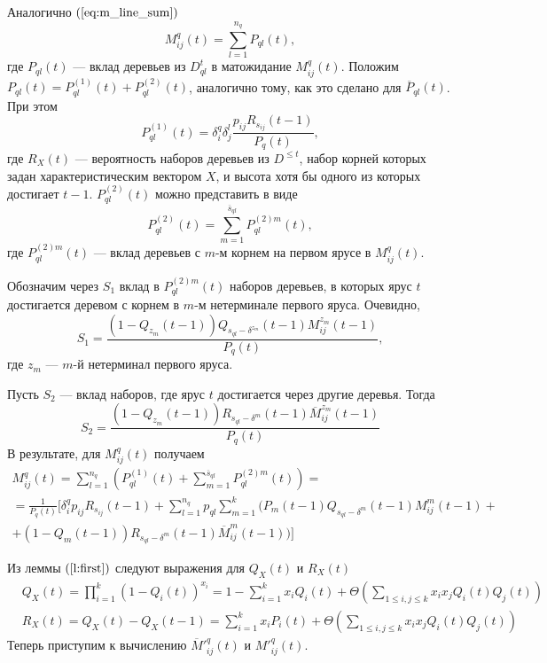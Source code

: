 \documentclass[12pt]{article}
\renewcommand{\leq}{\leqslant}
\begin{document}
Аналогично $(\ref{eq:m_line_sum})$
\begin{equation*}
	M^q_{ij}(t) = \sum_{l = 1}^{n_q} P_{ql}(t),
\end{equation*}
где $P_{ql}(t)$ --- вклад деревьев из $D^t_{ql}$ в матожидание $M^q_{ij}(t)$. Положим $P_{ql}(t) = P^{(1)}_{ql}(t) + P^{(2)}_{ql}(t)$, аналогично тому, как это сделано для $\overline{P}_{ql}(t)$. При этом
\begin{equation*}
	P^{(1)}_{ql}(t) = \delta^q_i \delta^l_j \frac{p_{ij} R_{s_{ij}}(t - 1)}{P_q(t)},
\end{equation*}
где $R_X(t)$ --- вероятность наборов деревьев из $D^{\leq t}$, набор корней которых задан характеристическим вектором $X$, и высота хотя бы одного из которых достигает $t - 1$. $P^{(2)}_{ql}(t)$ можно представить в виде
\begin{equation*}
	P^{(2)}_{ql}(t) = \sum_{m = 1}^{\overline{s}_{ql}} P^{(2)m}_{ql}(t),
\end{equation*}
где $P^{(2)m}_{ql}(t)$ --- вклад деревьев с $m$-м корнем на первом ярусе в $M^q_{ij}(t)$.

Обозначим через $S_1$ вклад в $P^{(2)m}_{ql}(t)$ наборов деревьев, в которых ярус $t$ достигается деревом с корнем в $m$-м нетерминале первого яруса. Очевидно,
\begin{equation*}
	S_1 = \frac{(1 - Q_{z_m}(t-1)) Q_{s_{ql} - \delta^{z_m}}(t - 1) M^{z_m}_{ij}(t - 1)}{P_q(t)},
\end{equation*}
где $z_m$ --- $m$-й нетерминал первого яруса.

Пусть $S_2$ --- вклад наборов, где ярус $t$ достигается через другие деревья. Тогда
\begin{equation*}
	S_2 = \frac{(1 - Q_{z_m}(t - 1)) R_{s_{ql} - \delta^m}(t - 1) \overline{M}^{z_m}_{ij}(t - 1)}{P_q(t)}
\end{equation*}
В результате, для $M^q_{ij}(t)$ получаем
\begin{multline*}
	M^q_{ij}(t) = \sum_{l = 1}^{n_q} \left( P^{(1)}_{ql}(t) + \sum_{m = 1}^{\overline{s}_{ql}} P^{(2)m}_{ql}(t) \right) = \\
	= \frac{1}{P_q(t)} [ \delta^q_i p_{ij} R_{s_{ij}}(t - 1) + \sum_{l = 1}^{n_q} p_{ql} \sum_{m = 1}^k (P_m(t - 1) Q_{s_{ql} - \delta^m}(t - 1) M^m_{ij}(t - 1) + \\
	+ (1 - Q_m(t - 1)) R_{s_{ql} - \delta^m}(t - 1) \overline{M}^m_{ij}(t - 1)) ]
\end{multline*}

Из леммы $(\ref{l:first})$ следуют выражения для $Q_X(t)$ и $R_X(t)$
\begin{equation}
\label{eq:qx_rx}
	\begin{split}
		&Q_X(t) = \prod_{i = 1}^k (1 - Q_i(t))^{x_i} = 1 - \sum_{i = 1}^k x_i Q_i(t) + \Theta \left( \sum_{1 \leq i,j \leq k} x_i x_j Q_i(t) Q_j(t) \right) \\
		&R_X(t) = Q_X(t) - Q_X(t - 1) = \sum_{i = 1}^k x_i P_i(t) + \Theta \left( \sum_{1 \leq i,j \leq k} x_i x_j Q_i(t) Q_j(t) \right)
	\end{split}
\end{equation}
Теперь приступим к вычислению $\overline{M}'^q_{ij}(t)$ и $M'^q_{ij}(t)$.
\end{document}
